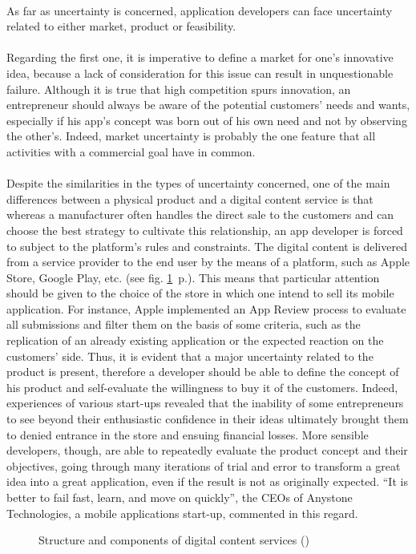 \documentclass[twoside]{report}
\begin{document}
	\paragraph{}
	As far as uncertainty is concerned, application developers can face uncertainty related to either market, product or feasibility. 
	\paragraph{}
	Regarding the first one, it is imperative to define a market for one's innovative idea, because a lack of consideration for this issue can result in unquestionable failure. Although it is true that high competition spurs innovation, an entrepreneur should always be aware of the potential customers' needs and wants, especially if his app's concept was born out of his own need and not by observing the other's. Indeed, market uncertainty is probably the one feature that all activities with a commercial goal have in common.
	\paragraph{}
	Despite the similarities in the types of uncertainty concerned, one of the main differences between a physical product and a digital content service is that whereas a manufacturer often handles the direct sale to the customers and can choose the best strategy to cultivate this relationship, an app developer is forced to subject to the platform's rules and constraints. The digital content is delivered from a service provider to the end user by the means of a platform, such as Apple Store, Google Play, etc. (see fig. \ref{fig:content_service}~p.\pageref{fig:content_service}). This means that particular attention should be given to the choice of the store in which one intend to sell its mobile application. For instance, Apple implemented an App Review process to evaluate all submissions and filter them on the basis of some criteria, such as the replication of an already existing application or the expected reaction on the customers' side. Thus, it is evident that a major uncertainty related to the product is present, therefore a developer should be able to define the concept of his product and self-evaluate the willingness to buy it of the customers. Indeed, experiences of various start-ups revealed that the inability of some entrepreneurs to see beyond their enthusiastic confidence in their ideas ultimately brought them to denied entrance in the store and ensuing financial losses. More sensible developers, though, are able to repeatedly evaluate the product concept and their objectives, going through many iterations of trial and error to transform a great idea into a great application, even if the result is not as originally expected. \enquote{It is better to fail fast, learn, and move on quickly}, the CEOs of Anystone Technologies, a mobile applications start-up, commented in this regard.
	\begin{figure}
		\begin{center}
			
			\caption{Structure and components of digital content services (\cite{kim_patterns_2012})}
			\label{fig:content_service}
		\end{center}
	\end{figure}
\end{document}
